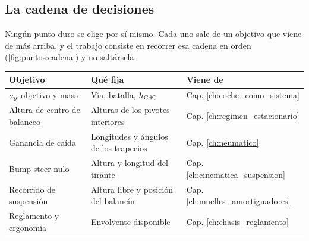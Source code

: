 \subsection{La cadena de decisiones}

Ningún punto duro se elige por sí mismo. Cada uno sale de un objetivo que viene
de más arriba, y el trabajo consiste en recorrer esa cadena en orden
(\cref{fig:puntos:cadena}) y no saltársela.

\begin{center}
\begin{tabularx}{\textwidth}{@{}lXl@{}}
\toprule
\textbf{Objetivo} & \textbf{Qué fija} & \textbf{Viene de} \\
\midrule
$a_y$ objetivo y masa & Vía, batalla, $h_{\mathrm{CdG}}$ & Cap. \ref{ch:coche_como_sistema} \\
Altura de centro de balanceo & Alturas de los pivotes interiores & Cap. \ref{ch:regimen_estacionario} \\
Ganancia de caída & Longitudes y ángulos de los trapecios & Cap. \ref{ch:neumatico} \\
Bump steer nulo & Altura y longitud del tirante & Cap. \ref{ch:cinematica_suspension} \\
Recorrido de suspensión & Altura libre y posición del balancín & Cap. \ref{ch:muelles_amortiguadores} \\
Reglamento y ergonomía & Envolvente disponible & Cap. \ref{ch:chasis_reglamento} \\
\bottomrule
\end{tabularx}
\end{center}

